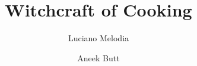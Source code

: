 \documentclass[ebook,12pt,oneside,openany]{memoir}
\title{Witchcraft of Cooking}
\author{Luciano Melodia \and Aneek Butt}
\begin{document}
\maketitle


\newpage
\tableofcontents*

\newpage

\newpage

\newpage

\newpage

\end{document}
